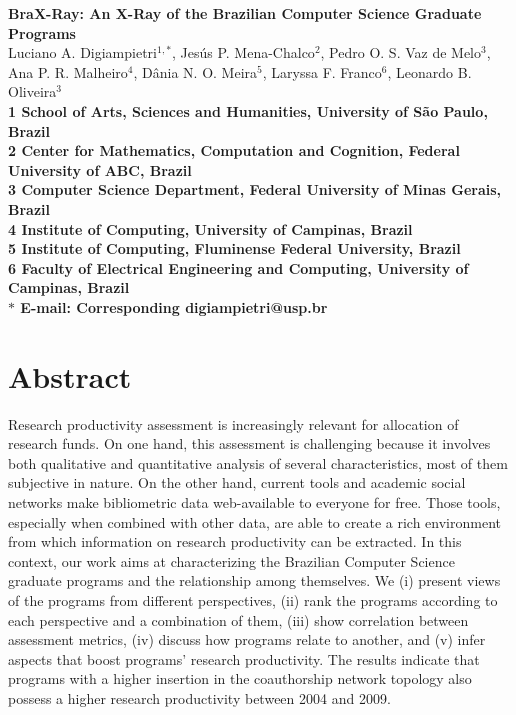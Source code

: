 \documentclass[10pt]{article}
\date{}
\begin{document}
\begin{flushleft}
{\Large
\textbf{BraX-Ray: An X-Ray of the Brazilian Computer Science Graduate Programs}
}
\\
Luciano A. Digiampietri$^{1,\ast}$, 
Jes\'us P. Mena-Chalco$^{2}$, 
Pedro O. S. Vaz de Melo$^{3}$,
Ana P. R. Malheiro$^{4}$,
D\^ania N. O. Meira$^{5}$,
Laryssa F. Franco$^{6}$,
Leonardo B. Oliveira$^{3}$
\\
\bf{1} School of Arts, Sciences and Humanities, University of S\~{a}o Paulo, Brazil
\\
\bf{2} Center for Mathematics, Computation and Cognition, Federal University of ABC, Brazil
\\
\bf{3} Computer Science Department, Federal University of Minas Gerais, Brazil
\\
\bf{4} Institute of Computing, University of Campinas, Brazil
\\
\bf{5} Institute of Computing, Fluminense Federal University, Brazil
\\
\bf{6} Faculty of Electrical Engineering and Computing, University of Campinas, Brazil
\\
$\ast$ E-mail: Corresponding digiampietri@usp.br
\end{flushleft}

\section*{Abstract}
Research productivity assessment is increasingly relevant for allocation of research funds.
On one hand, this assessment is challenging because it involves both qualitative and quantitative analysis of several
characteristics, most of them subjective in nature. 
On the other hand, current tools and academic social networks make bibliometric data web-available to everyone for free.
Those tools, especially when combined with other data, are able to create a rich environment from which information on research productivity can be extracted. In this context, our work aims at characterizing the Brazilian Computer Science graduate programs and the relationship among themselves.  
We (i) present views of the programs from different perspectives, (ii) rank the programs according to each perspective and a
combination of them, (iii) show correlation between assessment metrics, (iv) discuss how programs relate to another, and (v)
infer aspects that boost programs' research productivity.
The results indicate that programs with a higher insertion in the coauthorship network topology also possess a
higher research productivity between 2004 and 2009.
\end{document}
